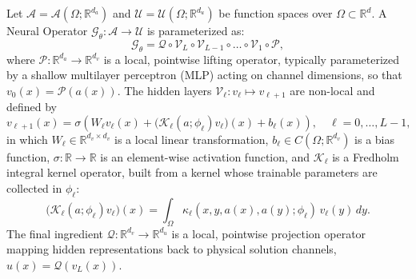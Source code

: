 \begin{definition}
\label{def:generic_no}
Let $\mathcal{A} = \mathcal{A}(\Omega; \mathbb{R}^{d_a})$ and $\mathcal{U} = \mathcal{U}(\Omega; \mathbb{R}^{d_u})$ be function spaces over $\Omega \subset \mathbb{R}^d$. A Neural Operator $\mathcal{G}_\theta : \mathcal{A} \to \mathcal{U}$ is parameterized as:
\begin{equation}
  \label{eq:no_composition}
  \mathcal{G}_\theta = \mathcal{Q} \circ \mathcal{V}_L \circ \mathcal{V}_{L-1} \circ \dots \circ \mathcal{V}_1 \circ \mathcal{P},
\end{equation}
where $\mathcal{P} : \mathbb{R}^{d_a} \to \mathbb{R}^{d_v}$ is a local, pointwise lifting operator, typically parameterized by a shallow multilayer perceptron (MLP) acting on channel dimensions, so that $v_0(x) = \mathcal{P}(a(x))$. The hidden layers $\mathcal{V}_\ell : v_\ell \mapsto v_{\ell+1}$ are non-local and defined by
\begin{equation}
  \label{eq:no_layer}
  v_{\ell+1}(x) = \sigma\left( W_\ell v_\ell(x) + \big(\mathcal{K}_\ell(a; \phi_\ell) v_\ell\big)(x) + b_\ell(x) \right), \quad \ell = 0, \dots, L-1,
\end{equation}
in which $W_\ell \in \mathbb{R}^{d_v \times d_v}$ is a local linear transformation, $b_\ell \in C(\Omega; \mathbb{R}^{d_v})$ is a bias function, $\sigma : \mathbb{R} \to \mathbb{R}$ is an element-wise activation function, and $\mathcal{K}_\ell$ is a Fredholm integral kernel operator, built from a kernel whose trainable parameters are collected in $\phi_\ell$:
\begin{equation}
  \label{eq:fredholm_kernel}
  \big(\mathcal{K}_\ell(a; \phi_\ell) v_\ell\big)(x) = \int_\Omega \kappa_\ell(x, y, a(x), a(y); \phi_\ell) \, v_\ell(y) \, dy.
\end{equation}
The final ingredient $\mathcal{Q} : \mathbb{R}^{d_v} \to \mathbb{R}^{d_u}$ is a local, pointwise projection operator mapping hidden representations back to physical solution channels, $u(x) = \mathcal{Q}(v_L(x))$.
\end{definition}


